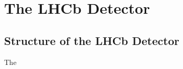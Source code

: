 \documentclass{article}
\begin{document}
\section{The LHCb Detector}
\subsection{Structure of the LHCb Detector}
The
\end{document}

